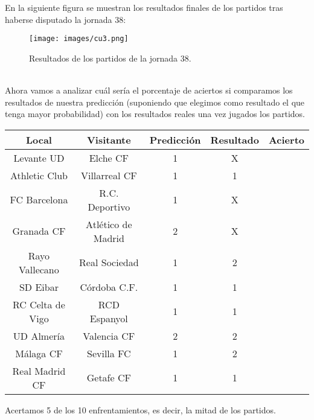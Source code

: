 \newpage

En la siguiente figura se muestran los resultados finales de los partidos tras haberse disputado la jornada 38:
\begin{figure}[H]
	\centering
	\texttt{[image: images/cu3.png]}
	\caption{Resultados de los partidos de la jornada 38.} \label{fig:result38}
\end{figure}
\ \\
Ahora vamos a analizar cuál sería el porcentaje de aciertos si comparamos los resultados de nuestra predicción (suponiendo que elegimos como resultado el que tenga mayor probabilidad) con los resultados reales una vez jugados los partidos.

\begin{center}
	\begin{tabular}{|c|c|c|c|c|}
		\hline \rowcolor{ao} Local & Visitante & Predicción & Resultado & Acierto \\ 
		\hline Levante UD & Elche CF & 1 & X & \begingroup\color{red}\xmark\endgroup \\ 
		\hline Athletic Club & Villarreal CF & 1 & 1 & \begingroup\color{green}\cmark\endgroup \\ 
		\hline FC Barcelona & R.C. Deportivo & 1 & X & \begingroup\color{red}\xmark\endgroup \\ 
		\hline Granada CF & Atlético de Madrid & 2 & X & \begingroup\color{red}\xmark\endgroup \\ 
		\hline Rayo Vallecano & Real Sociedad & 1 & 2 & \begingroup\color{red}\xmark\endgroup \\ 
		\hline SD Eibar & Córdoba C.F. & 1 & 1 & \begingroup\color{green}\cmark\endgroup \\ 
		\hline RC Celta de Vigo & RCD Espanyol & 1 & 1 & \begingroup\color{green}\cmark\endgroup \\ 
		\hline UD Almería & Valencia CF & 2 & 2 & \begingroup\color{green}\cmark\endgroup \\ 
		\hline Málaga CF & Sevilla FC & 1 & 2 & \begingroup\color{red}\xmark\endgroup \\ 
		\hline Real Madrid CF & Getafe CF & 1 & 1 & \begingroup\color{green}\cmark\endgroup \\ 
		\hline 
	\end{tabular} 
\end{center}

Acertamos 5 de los 10 enfrentamientos, es decir, la mitad de los partidos.\\

\newpage

